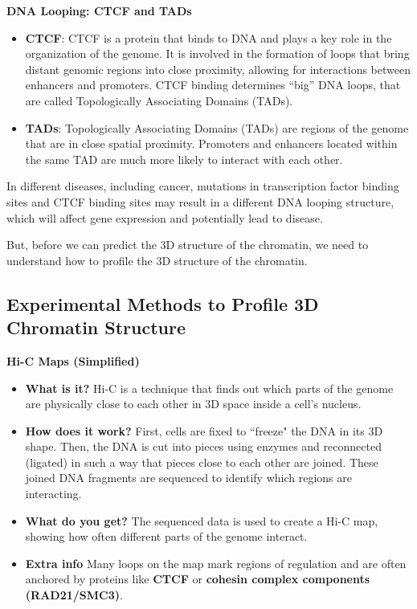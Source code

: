 \documentclass[a4paper]{article}
\begin{document}
\textbf{DNA Looping: CTCF and TADs}

\begin{itemize}
  \item \textbf{CTCF}: CTCF is a protein that binds to DNA and plays a key role
  in the organization of the genome. It is involved in the formation of loops
  that bring distant genomic regions into close proximity, allowing for
  interactions between enhancers and promoters. CTCF binding determines ``big''
  DNA loops, that are called Topologically Associating Domains (TADs).

  \item \textbf{TADs}: Topologically Associating Domains (TADs) are regions of
  the genome that are in close spatial proximity. Promoters and enhancers
  located within the same TAD are much more likely to interact with each other.

\end{itemize}

In different diseases, including cancer, mutations in transcription factor binding
sites and CTCF binding sites may result in a different DNA looping structure,
which will affect gene expression and potentially lead to disease.

But, before we can predict the 3D structure of the chromatin, we need to understand
how to profile the 3D structure of the chromatin.

\subsection*{Experimental Methods to Profile 3D Chromatin Structure}

\textbf{Hi-C Maps (Simplified)}

\begin{itemize}
  \item  \textbf{What is it?}
  Hi-C is a technique that finds out which parts of the genome are physically close to each other in 3D space inside a cell's nucleus.  
  
  \item \textbf{How does it work?}
  First, cells are fixed to ``freeze" the DNA in its 3D shape. Then, the DNA is cut into pieces using enzymes and reconnected (ligated) in such a way that pieces close to each other are joined. These joined DNA fragments are sequenced to identify which regions are interacting.  
  
  \item \textbf{What do you get?}
  The sequenced data is used to create a Hi-C map, showing how often different parts of the genome interact.  
  
  \item \textbf{Extra info}
  Many loops on the map mark regions of regulation and are often anchored by proteins like \textbf{CTCF} or \textbf{cohesin complex components (RAD21/SMC3)}.  
  
\end{itemize}
\end{document}
